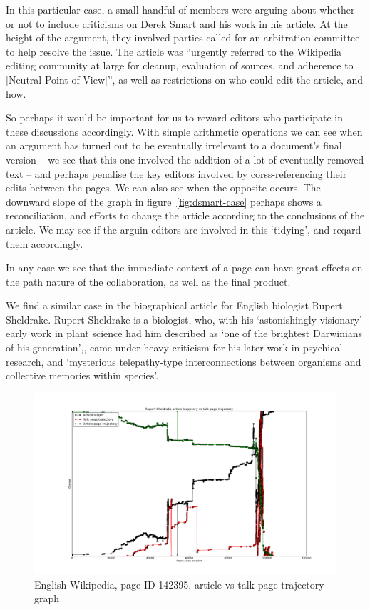 In this particular case, a small handful of members were arguing about
whether or not to include criticisms on Derek Smart and his work in
his article. At the height of the argument, they involved parties
called for an arbitration committee to help resolve the issue. The
article was ``urgently referred to the Wikipedia editing community at
large for cleanup, evaluation of sources, and adherence to
[Neutral Point of View]'', as well as restrictions on who could edit
the article, and how.

So perhaps it would be important for us to reward editors who
participate in these discussions accordingly. With simple arithmetic
operations we can see when an argument has turned out to be eventually
irrelevant to a document's final version -- we see that this one
involved the addition of a lot of eventually removed text -- and
perhaps penalise the key editors involved by corss-referencing their
edits between the pages. We can also see when the opposite occurs. The
downward slope of the graph in figure~\ref{fig:dsmart-case}
perhaps shows a reconciliation, and efforts to change the article
according to the conclusions of the article. We may see if the arguin
editors are involved in this `tidying', and reqard them accordingly.

In any case we see that the immediate context of a page can have great
effects on the path nature of the collaboration, as well as the final
product.

We find a similar case in the biographical article for English
biologist Rupert Sheldrake. Rupert Sheldrake is a biologist, who, with
his `astonishingly visionary' early work in plant science had him
described as `one of the brightest Darwinians of his
generation',\cite{odyssey-auxin}\cite{guardian-shel}, came under heavy
criticism for his later work in psychical research, and `mysterious
telepathy-type interconnections between organisms and collective
memories within species'.\cite{sheldrake-biog}

\begin{figure}[p]
  \centering
  \centering
  \includegraphics[width=\linewidth]{img/rsheldrake/RupertSheldrakecombo.png}
  \caption{English Wikipedia, page ID 142395, article vs talk page
    trajectory graph}
  \label{fig:sheldrake-plot}
\end{figure}

